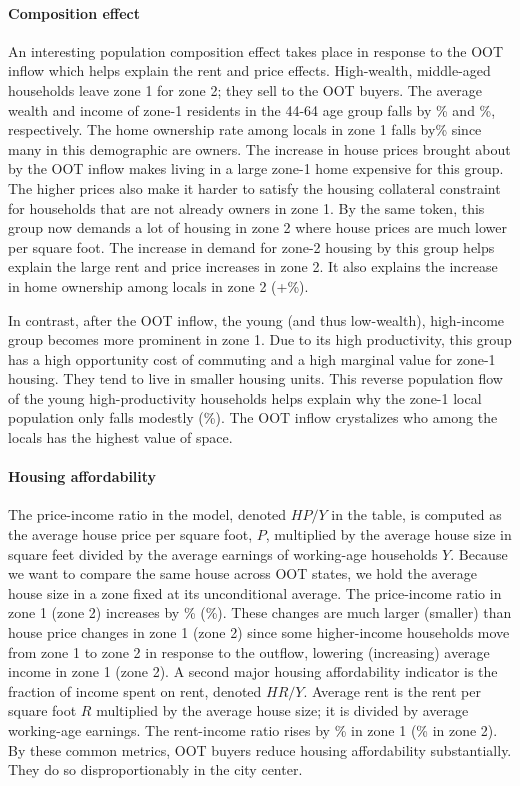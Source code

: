 \documentclass[letterpaper,12pt,dvipsnames,usenames]{article}
\theoremstyle{definition}
\begin{document}
\begin{spacing}{1.25}
\paragraph{Composition effect}
An interesting population composition effect takes place in response to the OOT inflow which helps explain the rent and price effects. High-wealth, middle-aged households leave zone 1 for zone 2; they sell to the OOT buyers. The average wealth and income of zone-1 residents in the 44-64 age group falls by {\NWMidChZoneOne}\% and {\WageMidChZoneOne}\%, respectively. The home ownership rate among locals in zone 1 falls by{\OwnLocalChangeZoneOne}\% since many in this demographic are owners. The increase in house prices brought about by the OOT inflow makes living in a large zone-1 home expensive for this group. The higher prices also make it harder to satisfy the housing collateral constraint for households that are not already owners in zone 1. By the same token, this group now demands a lot of housing in zone 2 where house prices are much lower per square foot. The increase in demand for zone-2 housing by this group helps explain the large rent and price increases in zone 2. It also explains the increase in home ownership among locals in zone 2 (+{\OwnLocalChangeZoneTwo}\%).

In contrast, after the OOT inflow, the young (and thus low-wealth), high-income group becomes more prominent in zone 1. Due to its high productivity, this group has a high opportunity cost of commuting and a high marginal value for zone-1 housing. They tend to live in smaller housing units. This reverse population flow of the young high-productivity households helps explain why the zone-1 local population only falls modestly ({}\%). The OOT inflow crystalizes who among the locals has the highest value of space.

\paragraph{Housing affordability}
The price-income ratio in the model, denoted $HP/Y$ in the table, is computed as the average house price per square foot, $P$, multiplied by the average house size in square feet divided by the average earnings of working-age households $Y$. Because we want to compare the same house across OOT states, we hold the average house size in a zone fixed at its unconditional average.
The price-income ratio in zone 1 (zone 2) increases  by {}\% ({}\%). These changes are much larger (smaller) than house price changes in zone 1 (zone 2) since some higher-income households move from zone 1 to zone 2 in response to the outflow, lowering (increasing) average income in zone 1 (zone 2).
A second major housing affordability indicator is the fraction of income spent on rent, denoted $HR/Y$. Average rent is the rent per square foot $R$ multiplied by the average house size; it is divided by average working-age earnings. The rent-income ratio rises by {}\% in zone 1 ({}\% in zone 2). By these common metrics, OOT buyers reduce housing affordability substantially. They do so disproportionably in the city center.


\end{spacing}
\end{document}
